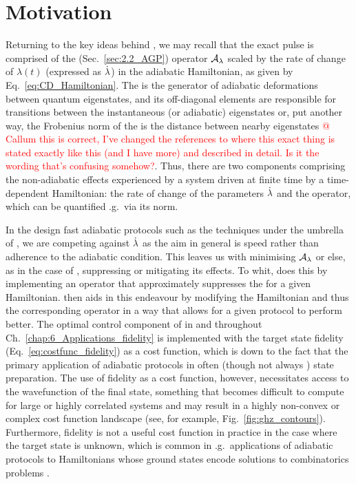 \section{Motivation}\label{sec:5.1_motivation}

Returning to the key ideas behind , we may recall that the exact  pulse is comprised of the  (Sec.~\ref{sec:2.2_AGP}) operator $\mathcal{A}_{\lambda}$ scaled by the rate of change of $\lambda(t)$ (expressed as $\dot{\lambda}$) in the adiabatic Hamiltonian, as given by Eq.~\eqref{eq:CD_Hamiltonian}. The  is the generator of adiabatic deformations between quantum eigenstates, and its off-diagonal elements are responsible for transitions between the instantaneous (or adiabatic) eigenstates or, put another way, the Frobenius norm of the  is the distance between nearby eigenstates \cite{pandey_adiabatic_2020, nandy_delayed_2022} \textcolor{red}{@ Callum this is correct, I've changed the references to where this exact thing is stated exactly like this (and I have more) and described in detail. Is it the wording that's confusing somehow?}. Thus, there are two components comprising the non-adiabatic effects experienced by a system driven at finite time by a time-dependent Hamiltonian: the rate of change of the parameters $\dot{\lambda}$ and the  operator, which can be quantified \@e.g.~via its norm. 

In the design fast adiabatic protocols such as the techniques under the umbrella of , we are competing against $\dot{\lambda}$ as the aim in general is speed rather than adherence to the adiabatic condition. This leaves us with minimising $\mathcal{A}_{\lambda}$ or else, as in the case of , suppressing or mitigating its effects. To whit,  does this by implementing an operator that approximately suppresses the  for a given Hamiltonian.  then aids in this endeavour by modifying the Hamiltonian and thus the corresponding  operator in a way that allows for a given  protocol to perform better. The optimal control component of  in \cite{cepaite_cold_2023} and throughout Ch.~\ref{chap:6_Applications_fidelity} is implemented with the target state fidelity (Eq.~\eqref{eq:costfunc_fidelity}) as a cost function, which is down to the fact that the primary application of adiabatic protocols in often (though not always \cite{pelegri_high-fidelity_2022}) state preparation. The use of fidelity as a cost function, however, necessitates access to the wavefunction of the final state, something that becomes difficult to compute for large or highly correlated systems and may result in a highly non-convex or complex cost function landscape (see, for example, Fig.~\ref{fig:ghz_contours}). Furthermore, fidelity is not a useful cost function in practice in the case where the target state is unknown, which is common in \@e.g.~applications of adiabatic protocols to Hamiltonians whose ground states encode solutions to combinatorics problems \cite{ebadi_quantum_2022, albash_adiabatic_2018}. 


